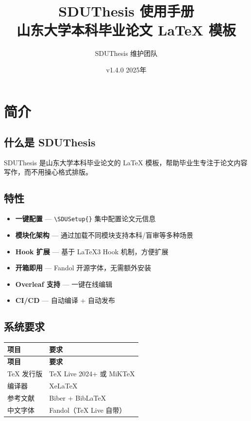 \documentclass[a4paper,12pt]{ctexbook}
\title{\textbf{SDUThesis 使用手册} \\ \large 山东大学本科毕业论文 \LaTeX{} 模板}
\author{SDUThesis 维护团队}
\date{v1.4.0 \quad 2025年}
\begin{document}
\maketitle
\tableofcontents

\chapter{简介}

\section{什么是 SDUThesis}

SDUThesis 是山东大学本科毕业论文的 \LaTeX{} 模板，帮助毕业生专注于论文内容写作，而不用操心格式排版。

\section{特性}

\begin{itemize}[nosep]
  \item \textbf{一键配置} — \lstinline|\SDUSetup{}| 集中配置论文元信息
  \item \textbf{模块化架构} — 通过加载不同模块支持本科/盲审等多种场景
  \item \textbf{Hook 扩展} — 基于 \LaTeX3 Hook 机制，方便扩展
  \item \textbf{开箱即用} — Fandol 开源字体，无需额外安装
  \item \textbf{Overleaf 支持} — 一键在线编辑
  \item \textbf{CI/CD} — 自动编译 + 自动发布
\end{itemize}

\section{系统要求}

\begin{longtable}{ll}
\toprule
\textbf{项目} & \textbf{要求} \\
\midrule
\endfirsthead
\toprule
\textbf{项目} & \textbf{要求} \\
\midrule
\endhead
\bottomrule
\endfoot
TeX 发行版 & TeX Live 2024+ 或 MiKTeX \\
编译器 & XeLaTeX \\
参考文献 & Biber + Bib\LaTeX{} \\
中文字体 & Fandol（TeX Live 自带） \\
\end{longtable}
\end{document}

